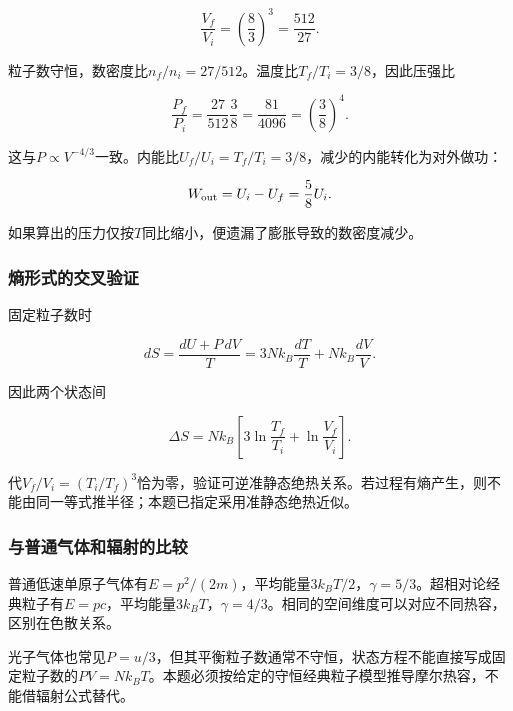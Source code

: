 \documentclass[12pt,a4paper,fontset=fandol]{ctexart}
\begin{document}
\[
\frac{V_f}{V_i}=\left(\frac83\right)^3=\frac{512}{27}.
\]

粒子数守恒，数密度比\(n_f/n_i=27/512\)。温度比\(T_f/T_i=3/8\)，因此压强比

\[
\frac{P_f}{P_i}=\frac{27}{512}\frac38
=\frac{81}{4096}=\left(\frac38\right)^4.
\]

这与\(P\propto V^{-4/3}\)一致。内能比\(U_f/U_i=T_f/T_i=3/8\)，减少的内能转化为对外做功：

\[
W_{\rm out}=U_i-U_f=\frac58U_i.
\]

如果算出的压力仅按\(T\)同比缩小，便遗漏了膨胀导致的数密度减少。

\subsubsection{熵形式的交叉验证}\label{ux71b5ux5f62ux5f0fux7684ux4ea4ux53c9ux9a8cux8bc1}

固定粒子数时

\[
dS=\frac{dU+P\,dV}{T}
=3Nk_B\frac{dT}{T}+Nk_B\frac{dV}{V}.
\]

因此两个状态间

\[
\Delta S=Nk_B\left[3\ln\frac{T_f}{T_i}
+\ln\frac{V_f}{V_i}\right].
\]

代\(V_f/V_i=(T_i/T_f)^3\)恰为零，验证可逆准静态绝热关系。若过程有熵产生，则不能由同一等式推半径；本题已指定采用准静态绝热近似。

\subsubsection{与普通气体和辐射的比较}\label{ux4e0eux666eux901aux6c14ux4f53ux548cux8f90ux5c04ux7684ux6bd4ux8f83}

普通低速单原子气体有\(E=p^2/(2m)\)，平均能量\(3k_BT/2\)，\(\gamma=5/3\)。超相对论经典粒子有\(E=pc\)，平均能量\(3k_BT\)，\(\gamma=4/3\)。相同的空间维度可以对应不同热容，区别在色散关系。

光子气体也常见\(P=u/3\)，但其平衡粒子数通常不守恒，状态方程不能直接写成固定粒子数的\(PV=Nk_BT\)。本题必须按给定的守恒经典粒子模型推导摩尔热容，不能借辐射公式替代。
\end{document}
